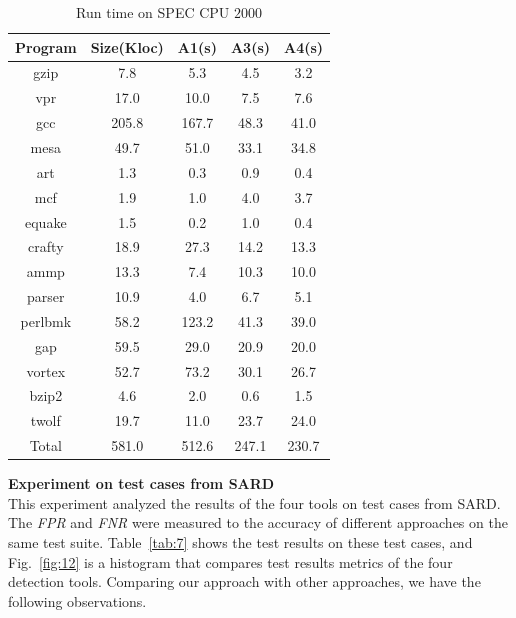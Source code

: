\begin{table}[!h]
\center
\caption{Run time on SPEC CPU $2000$}\label{tab:6}
\hspace{-0.5cm}\begin{tabular}{|c|c|c|c|c|}
\hline
\textbf{Program}& \textbf{Size(Kloc)} & \textbf{A1(s)} & \textbf{A3(s)} & \textbf{A4(s)}\\
\hline
gzip       & 7.8    & 5.3  & 4.5 & 3.2\\
\hline
vpr        & 17.0   & 10.0  & 7.5 & 7.6\\
\hline
gcc        & 205.8 & 167.7  & 48.3 & 41.0 \\
\hline
mesa     & 49.7   & 51.0  & 33.1 & 34.8\\
\hline
art         & 1.3     & 0.3  & 0.9 & 0.4\\
\hline
mcf        & 1.9     & 1.0  & 4.0 & 3.7\\
\hline
equake   & 1.5     & 0.2  & 1.0 & 0.4\\
\hline
crafty     & 18.9   & 27.3	 & 14.2	 & 13.3\\
\hline
ammp    & 13.3   & 7.4 & 10.3 & 10.0\\
\hline
parser    & 10.9   & 4.0	 & 6.7	 & 5.1\\
\hline
perlbmk & 58.2   & 123.2   & 41.3	 & 39.0\\
\hline
gap        & 59.5   &  29.0 & 20.9 & 20.0\\
\hline
vortex    & 52.7    & 73.2	 & 30.1	 & 26.7\\
\hline 
bzip2     & 4.6      & 2.0 & 0.6	 & 1.5\\
\hline
twolf     & 19.7     & 11.0 & 23.7	 & 24.0\\
\hline
Total     & 581.0    & 512.6 & 247.1 & 230.7\\
\hline
\end{tabular}
\end{table}

\noindent\textbf{Experiment on test cases from SARD} 
\\
This experiment analyzed the results of the four tools on test cases from SARD. The \textit{FPR} and \textit{FNR} were measured to the accuracy of different approaches on the same test suite. Table~\ref{tab:7} shows the test results on these test cases, and Fig.~\ref{fig:12} is a histogram that compares test results metrics of the four detection tools. Comparing our approach with other approaches, we have the following observations.


